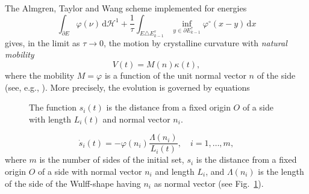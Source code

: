 \documentclass{interact}
\numberwithin{equation}{section}
\theoremstyle{definition}
\begin{document}
The Almgren, Taylor and Wang scheme implemented for energies
\begin{equation}
\int_{\partial E}\varphi(\nu)\,\mathrm{d}\mathcal{H}^1+\frac{1}{\tau}\int_{E\triangle E_{k-1}^\tau}\inf_{y\in\partial E_{k-1}^\tau}\varphi^\circ(x-y)\,\mathrm{d}x
\label{ATWgen}
\end{equation}
gives, in the limit as $\tau\to0$, the motion by crystalline curvature with \emph{natural mobility}
\begin{equation}
V(t)=M(n)\kappa(t),
\label{mobequa}
\end{equation}
where the mobility $M=\varphi$ is a function of the unit normal vector $n$ of the side (see, e.g., \cite{Ta0, TCH1, TCH2, Ta2, CC}). More precisely, the evolution is governed by equations
\begin{figure}[htbp]
\centering
\def\svgwidth{150pt}

\caption{The function $s_i(t)$ is the distance from a fixed origin $O$ of a side with length $L_i(t)$ and normal vector $n_i$.}\label{fig:dist}
\end{figure}
\begin{equation}
\dot{s}_i(t)=-\varphi(n_i)\frac{\Lambda(n_i)}{L_i(t)},\quad i=1,\dots,m,
\label{equamotions}
\end{equation}
where $m$ is the number of sides of the initial set, $s_i$ is the distance from a fixed origin $O$ of a side with normal vector $n_i$ and length $L_i$, and $\Lambda(n_i)$ is the length of the side of the Wulff-shape having $n_i$ as normal vector (see Fig.~\ref{fig:dist}).
\end{document}
